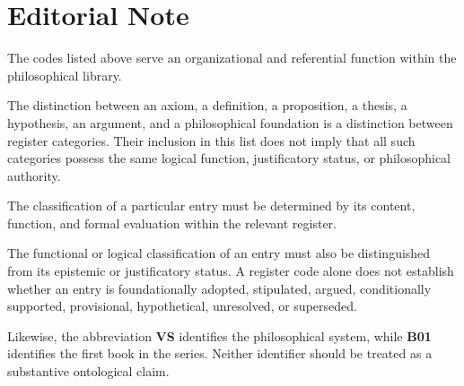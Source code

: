 
\section*{Editorial Note}

The codes listed above serve an organizational and referential
function within the philosophical library.

The distinction between an axiom, a definition, a proposition,
a thesis, a hypothesis, an argument, and a philosophical foundation
is a distinction between register categories. Their inclusion
in this list does not imply that all such categories possess
the same logical function, justificatory status, or philosophical
authority.

The classification of a particular entry must be determined
by its content, function, and formal evaluation within the
relevant register.

The functional or logical classification of an entry must also
be distinguished from its epistemic or justificatory status.
A register code alone does not establish whether an entry is
foundationally adopted, stipulated, argued, conditionally supported,
provisional, hypothetical, unresolved, or superseded.

Likewise, the abbreviation \textbf{VS} identifies the philosophical
system, while \textbf{B01} identifies the first book in the series.
Neither identifier should be treated as a substantive ontological
claim.


